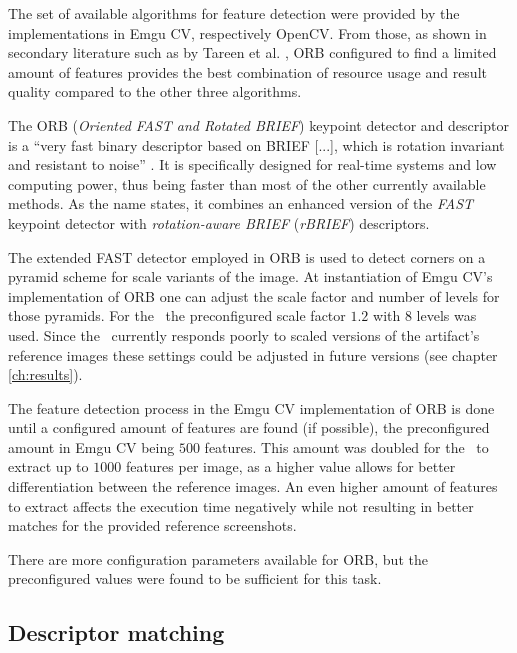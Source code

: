 The set of available algorithms for feature detection were provided by the implementations in Emgu CV, respectively OpenCV. From those, as shown in secondary literature such as by Tareen et al. \cite{orb_comparison}, ORB configured to find a limited amount of features provides the best combination of resource usage and result quality compared to the other three algorithms.

The ORB (\emph{Oriented FAST and Rotated BRIEF}) keypoint detector and descriptor is a ``very fast binary descriptor based on BRIEF [...], which is rotation invariant and resistant to noise'' \cite[p.~1]{orb}. It is specifically designed for real-time systems and low computing power, thus being faster than most of the other currently available methods. As the name states, it combines an enhanced version of the \emph{FAST} \cite{fast} keypoint detector with \emph{rotation-aware BRIEF} (\emph{rBRIEF}) \cite{brief} descriptors. \cite{orb, orb_comparison, fast, brief}

The extended FAST detector employed in ORB is used to detect corners on a pyramid scheme for scale variants \cite{scale_pyramids} of the image. At instantiation of Emgu CV's implementation of ORB one can adjust the scale factor and number of levels for those pyramids. For the \vd~the preconfigured scale factor $1.2$ with $8$ levels was used. Since the \vd~currently responds poorly to scaled versions of the artifact's reference images these settings could be adjusted in future versions (see chapter \ref{ch:results}).

The feature detection process in the Emgu CV implementation of ORB is done until a configured amount of features are found (if possible), the preconfigured amount in Emgu CV being $500$ features. This amount was doubled for the \vd~to extract up to $1000$ features per image, as a higher value allows for better differentiation between the reference images. An even higher amount of features to extract affects the execution time negatively while not resulting in better matches for the provided reference screenshots.

There are more configuration parameters available for ORB, but the preconfigured values were found to be sufficient for this task.

\subsection{Descriptor matching}\label{sec:tech-bg:subsec:descriptor-matching}

